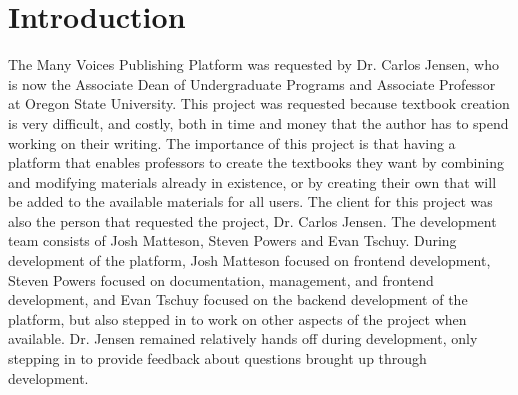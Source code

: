 \documentclass[onecolumn, draftclsnofoot,10pt, compsoc]{IEEEtran}
\begin{document}
\newpage
\section{Introduction}
The Many Voices Publishing Platform was requested by Dr. Carlos Jensen, who is now the Associate Dean of Undergraduate Programs
and Associate Professor at Oregon State University. This project was requested because textbook creation is very difficult, 
and costly, both in time and money that the author has to spend working on their writing. The importance of this project is 
that having a platform that enables professors to create the textbooks they want by combining and modifying materials already 
in existence, or by creating their own that will be added to the available materials for all users. The client for this project
was also the person that requested the project, Dr. Carlos Jensen. The development team consists of Josh Matteson, Steven Powers
and Evan Tschuy. During development of the platform, Josh Matteson focused on frontend development, Steven Powers focused on 
documentation, management, and frontend development, and Evan Tschuy focused on the backend development of the platform, but also 
stepped in to work on other aspects of the project when available. Dr. Jensen remained relatively hands off during development, 
only stepping in to provide feedback about questions brought up through development.
\end{document}

